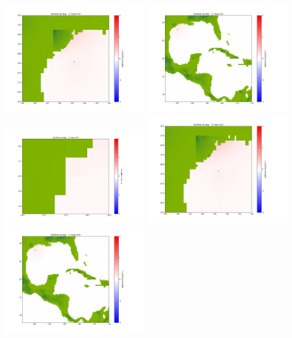 \documentclass[11pt]{article}
\begin{document}
\includegraphics[width=0.475\textwidth]{frame0063fig1002.png}
\vskip 10pt 
\includegraphics[width=0.475\textwidth]{frame0063fig1003.png}
\vskip 10pt 
\includegraphics[width=0.475\textwidth]{frame0064fig1001.png}
\includegraphics[width=0.475\textwidth]{frame0064fig1002.png}
\vskip 10pt 
\includegraphics[width=0.475\textwidth]{frame0064fig1003.png}
\end{document}
